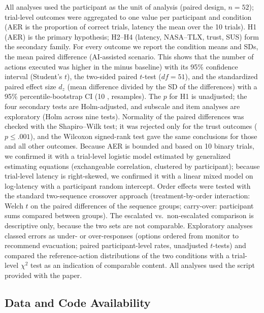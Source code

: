 \documentclass[journal]{IEEEtran}
\theoremstyle{plain}
\theoremstyle{definition}
\providecommand{\DIFaddtex}[1]{{\protect\color{blue} \sf #1}} %
\providecommand{\DIFdeltex}[1]{{\protect\color{red} \scriptsize #1}} %
\providecommand{\DIFaddbegin}{} %
\providecommand{\DIFaddend}{} %
\providecommand{\DIFdelbegin}{} %
\providecommand{\DIFdelend}{} %
\providecommand{\DIFadd}[1]{\texorpdfstring{\DIFaddtex{#1}}{#1}} %
\providecommand{\DIFdel}[1]{\texorpdfstring{\DIFdeltex{#1}}{}} %
\newcommand{\DIFscaledelfig}{0.5}
\newlength{\DIFdelgraphicswidth} %
\newlength{\DIFdelgraphicsheight} %
\newcommand{\DIFaddincludegraphics}[2][]{{\color{blue}\fbox{\DIFOincludegraphics[#1]{#2}}}} %
\newcommand{\DIFdelincludegraphics}[2][]{%
\sbox{\DIFdelgraphicsbox}{\DIFOincludegraphics[#1]{#2}}%
\settoboxwidth{\DIFdelgraphicswidth}{\DIFdelgraphicsbox} %
\settoboxtotalheight{\DIFdelgraphicsheight}{\DIFdelgraphicsbox} %
\scalebox{\DIFscaledelfig}{%
\parbox[b]{\DIFdelgraphicswidth}{\usebox{\DIFdelgraphicsbox}\\[-\baselineskip] \rule{\DIFdelgraphicswidth}{0em}}\llap{\resizebox{\DIFdelgraphicswidth}{\DIFdelgraphicsheight}{%
\setlength{\unitlength}{\DIFdelgraphicswidth}%
\begin{picture}(1,1)%
\thicklines\linethickness{2pt} %
{\color[rgb]{1,0,0}\put(0,0){\framebox(1,1){}}}%
{\color[rgb]{1,0,0}\put(0,0){\line( 1,1){1}}}%
{\color[rgb]{1,0,0}\put(0,1){\line(1,-1){1}}}%
\end{picture}%
}\hspace*{3pt}}} %
} %
\DeclareRobustCommand{\DIFaddbegin}{\DIFOaddbegin \let\includegraphics\DIFaddincludegraphics} %
\DeclareRobustCommand{\DIFaddend}{\DIFOaddend \let\includegraphics\DIFOincludegraphics} %
\DeclareRobustCommand{\DIFdelbegin}{\DIFOdelbegin \let\includegraphics\DIFdelincludegraphics} %
\DeclareRobustCommand{\DIFdelend}{\DIFOaddend \let\includegraphics\DIFOincludegraphics} %
\begin{document}
    \DIFadd{All analyses used the participant as the unit of analysis (paired design, $n=52$); trial-level outcomes were aggregated to one value per participant and condition (AER is the proportion of correct trials, latency the mean over the 10 trials). H1 (AER) is }\DIFaddend the \DIFaddbegin \DIFadd{primary hypothesis; H2--H4 (latency, NASA--TLX, trust, SUS) form the secondary family. For every outcome we report the condition means and SDs, the mean paired difference (}\DIFaddend AI-assisted \DIFdelbegin \DIFdel{scenario. This shows that the number of actions executed was higher in the }\DIFdelend \DIFaddbegin \DIFadd{minus baseline) with its 95\% confidence interval (Student's $t$), the two-sided paired $t$-test ($df=51$), and the standardized paired effect size $d_z$ \cite{Lakens2013} (mean difference divided by the SD of the differences) with a 95\% percentile-bootstrap CI (10}{\DIFadd{,}}\DIFadd{000 resamples). The $p$ for H1 is unadjusted; the four secondary tests are Holm-adjusted, and subscale and item analyses are exploratory (Holm across nine tests). Normality of the paired differences was checked with the Shapiro--Wilk test; it was rejected only for the trust outcomes ($p \leq .001$), and the Wilcoxon signed-rank test gave the same conclusions for those and all other outcomes. Because AER is bounded and based on 10 binary trials, we confirmed it with a trial-level logistic model estimated by generalized estimating equations (exchangeable correlation, clustered by participant); because trial-level latency is right-skewed, we confirmed it with a linear mixed model on log-latency with a participant random intercept. Order effects were tested with the standard two-sequence crossover approach (treatment-by-order interaction: Welch $t$ on the paired differences of the sequence groups; carry-over: participant sums compared between groups). The escalated vs.\ non-escalated comparison is descriptive only, because the two sets are not comparable. Exploratory analyses classed errors as under- or over-responses (options ordered from monitor to recommend evacuation; paired participant-level rates, unadjusted $t$-tests) and compared the reference-action distributions of the two conditions with a trial-level $\chi^2$ test as an indication of comparable content. All analyses used the script provided with the paper.
    }\subsection{\DIFadd{Data and Code Availability}}
    \label{sec:data}
\end{document}
